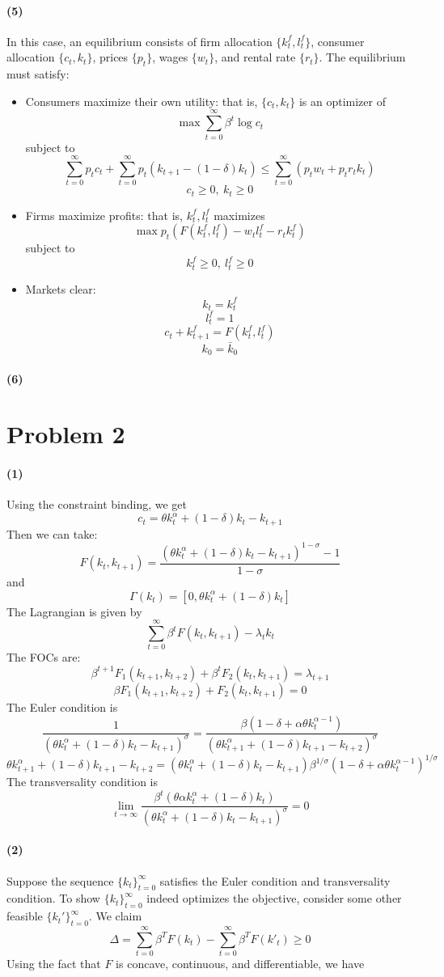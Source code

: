 \documentclass[10pt,letter]{article}
\newcommand{\problem}[1]{\section*{Problem #1}}
\newcommand{\problempart}[1]{\paragraph{#1}}
\begin{document}
\problempart{(5)}
In this case, an equilibrium consists of firm allocation $\{ k_t^f, l_t^f \}$, consumer allocation $\{ c_t, k_t \}$, prices $\{ p_t \}$, wages $\{ w_t \}$, and rental rate $\{ r_t \}$. The equilibrium must satisfy:
\begin{itemize}
\item Consumers maximize their own utility: that is, $\{c_t, k_t \}$ is an optimizer of
\[ \max \sum_{t=0}^\infty \beta^t \log c_t \]
subject to
\[ \sum_{t=0}^\infty p_t c_t + \sum_{t=0}^\infty p_t (k_{t+1} - (1-\delta)k_t)  \le \sum_{t=0}^\infty (p_t w_t + p_t r_t k_t) \]
\[ c_t\ge 0, \ k_t \ge 0 \]
\item Firms maximize profits: that is, $k_t^f, l_t^f$ maximizes
\[ \max p_t (F(k^f_t, l^f_t) - w_t l^f_t -r_t k^f_t) \]
subject to
\[k^f_t \ge 0, \ l^f_t \ge 0\]
\item Markets clear:
\[ k_t = k^f_t \]
\[ l_t^f = 1 \]
\[ c_t + k_{t+1}^f = F(k^f_t, l^f_t) \]
\[ k_0 = \bar{k}_0 \]
\end{itemize}
\problempart{(6)}
\problem{2}
\problempart{(1)}
Using the constraint binding, we get
\[ c_t = \theta k_t^\alpha + (1-\delta)k_t - k_{t+1} \]
Then we can take:
\[ F(k_t, k_{t+1}) = \frac{(\theta k_t^\alpha + (1-\delta)k_t - k_{t+1})^{1-\sigma} - 1}{1-\sigma} \]
and
\[ \Gamma(k_t) = [0, \theta k_t^\alpha + (1-\delta)k_t]\]
The Lagrangian is given by
\[ \sum_{t=0}^\infty \beta^t F(k_t, k_{t+1}) - \lambda_t k_t \]
The FOCs are:
\[ \beta^{t+1} F_1(k_{t+1}, k_{t+2}) + \beta^t F_2(k_{t}, k_{t+1})  = \lambda_{t+1} \]
\[ \beta F_1(k_{t+1}, k_{t+2}) + F_2(k_{t}, k_{t+1})  = 0 \]
The Euler condition is
\[ \frac{1}{(\theta k_t^\alpha + (1-\delta)k_t - k_{t+1})^\sigma} = \frac{\beta(1-\delta + \alpha \theta k_t^{\alpha - 1})}{(\theta k_{t+1}^\alpha + (1-\delta)k_{t+1} - k_{t+2})^\sigma} \]
\[ \theta k_{t+1}^\alpha + (1-\delta)k_{t+1} - k_{t+2} = (\theta k_t^\alpha + (1-\delta)k_t - k_{t+1}) \beta^{1/\sigma}(1-\delta + \alpha \theta k_t^{\alpha - 1})^{1/\sigma} \]
The transversality condition is
\[ \lim_{t\to\infty} \frac{\beta^t \left( \theta \alpha k_t^{\alpha} + (1 - \delta)k_t \right)}{(\theta k_t^\alpha + (1-\delta)k_t - k_{t+1})^{\sigma}}  = 0 \]
\problempart{(2)} Suppose the sequence $\{ k_t \}_{t=0}^\infty$ satisfies the Euler condition and transversality condition. To show $\{ k_t \}_{t=0}^\infty$ indeed optimizes the objective, consider some other feasible $\{ k_t' \}_{t=0}^\infty$. We claim
\[ \Delta = \sum_{t=0}^\infty \beta^T F(k_t) - \sum_{t=0}^\infty \beta^T F(k'_t) \ge 0 \]
Using the fact that $F$ is concave, continuous, and differentiable, we have
\end{document}
